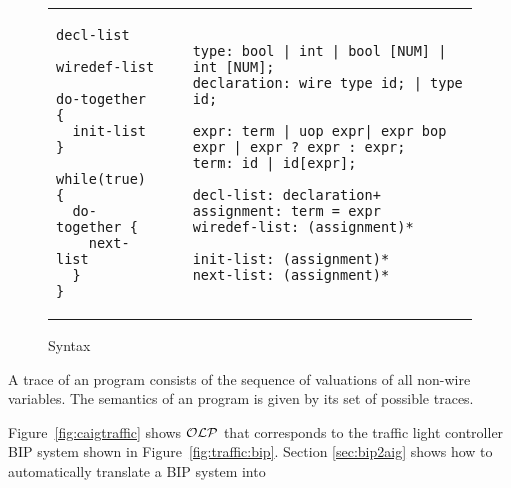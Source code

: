 \begin{figure}
\begin{tabular}{p{3cm}p{0.5cm}p{12cm}}
\begin{lstlisting}
decl-list

wiredef-list

do-together {
  init-list 
}

while(true) {
  do-together {
    next-list
  } 
}
\end{lstlisting}
&
&
\begin{lstlisting}
type: bool | int | bool [NUM] | int [NUM]; 
declaration: wire type id; | type id;

expr: term | uop expr| expr bop expr | expr ? expr : expr;
term: id | id[expr]; 

decl-list: declaration+
assignment: term = expr
wiredef-list: (assignment)*

init-list: (assignment)* 
next-list: (assignment)* 
\end{lstlisting}
\end{tabular}
\caption{\caig Syntax}
\label{fig:gr}
\end{figure}


\begin{definition}
A trace of an \caig program consists of the sequence of valuations of all non-wire variables. The semantics of an \caig program is given by its set of possible traces.  
\end{definition}

\begin{example}
Figure~\ref{fig:caigtraffic} shows $\mathcal{OLP}$ that corresponds to the traffic light controller BIP system shown in Figure~\ref{fig:traffic:bip}. Section \ref{sec:bip2aig} shows how to automatically translate a BIP system into \caig

\end{example}